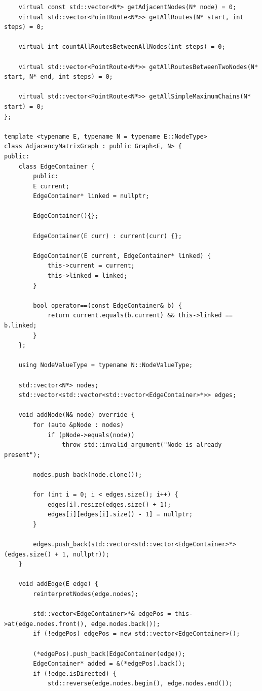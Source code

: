 \documentclass[a4paper,14pt]{extarticle}
\begin{document}
\begin{enumerate}[1.]
\begin{verbatim}
    virtual const std::vector<N*> getAdjacentNodes(N* node) = 0;
    virtual std::vector<PointRoute<N*>> getAllRoutes(N* start, int steps) = 0;

    virtual int countAllRoutesBetweenAllNodes(int steps) = 0;

    virtual std::vector<PointRoute<N*>> getAllRoutesBetweenTwoNodes(N* start, N* end, int steps) = 0;

    virtual std::vector<PointRoute<N*>> getAllSimpleMaximumChains(N* start) = 0;
};

template <typename E, typename N = typename E::NodeType>
class AdjacencyMatrixGraph : public Graph<E, N> {
public:
    class EdgeContainer {
        public:
        E current;
        EdgeContainer* linked = nullptr;

        EdgeContainer(){};

        EdgeContainer(E curr) : current(curr) {};

        EdgeContainer(E current, EdgeContainer* linked) {
            this->current = current;
            this->linked = linked;
        }

        bool operator==(const EdgeContainer& b) {
            return current.equals(b.current) && this->linked == b.linked;
        }
    };

    using NodeValueType = typename N::NodeValueType;

    std::vector<N*> nodes;
    std::vector<std::vector<std::vector<EdgeContainer>*>> edges;

    void addNode(N& node) override {
        for (auto &pNode : nodes) 
            if (pNode->equals(node)) 
                throw std::invalid_argument("Node is already present");

        nodes.push_back(node.clone());

        for (int i = 0; i < edges.size(); i++) {
            edges[i].resize(edges.size() + 1);
            edges[i][edges[i].size() - 1] = nullptr;
        }

        edges.push_back(std::vector<std::vector<EdgeContainer>*>(edges.size() + 1, nullptr));
    }

    void addEdge(E edge) {
        reinterpretNodes(edge.nodes);

        std::vector<EdgeContainer>*& edgePos = this->at(edge.nodes.front(), edge.nodes.back());
        if (!edgePos) edgePos = new std::vector<EdgeContainer>();

        (*edgePos).push_back(EdgeContainer(edge));
        EdgeContainer* added = &(*edgePos).back();
        if (!edge.isDirected) {
            std::reverse(edge.nodes.begin(), edge.nodes.end());


\end{verbatim}
\end{enumerate}
\end{document}
